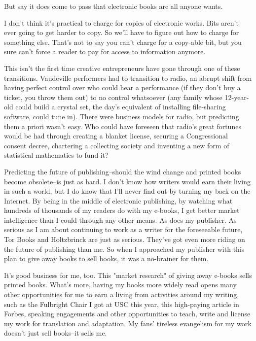 But say it does come to pass that electronic books are all anyone
wants.

I don't think it's practical to charge for copies of electronic
works. Bits aren't ever going to get harder to copy. So we'll have
to figure out how to charge for something else. That's not to say
you can't charge for a copy-able bit, but you sure can't force a
reader to pay for access to information anymore.

This isn't the first time creative entrepreneurs have gone through
one of these transitions. Vaudeville performers had to transition
to radio, an abrupt shift from having perfect control over who
could hear a performance (if they don't buy a ticket, you throw
them out) to no control whatsoever (any family whose 12-year-old
could build a crystal set, the day's equivalent of installing
file-sharing software, could tune in). There were business models
for radio, but predicting them a priori wasn't easy. Who could have
foreseen that radio's great fortunes would be had through creating
a blanket license, securing a Congressional consent decree,
chartering a collecting society and inventing a new form of
statistical mathematics to fund it?

Predicting the future of publishing--should the wind change and
printed books become obsolete--is just as hard. I don't know how
writers would earn their living in such a world, but I do know that
I'll never find out by turning my back on the Internet. By being in
the middle of electronic publishing, by watching what hundreds of
thousands of my readers do with my e-books, I get better market
intelligence than I could through any other means. As does my
publisher. As serious as I am about continuing to work as a writer
for the foreseeable future, Tor Books and Holtzbrinck are just as
serious. They've got even more riding on the future of publishing
than me. So when I approached my publisher with this plan to give
away books to sell books, it was a no-brainer for them.

It's good business for me, too. This "market research" of giving
away e-books sells printed books. What's more, having my books more
widely read opens many other opportunities for me to earn a living
from activities around my writing, such as the Fulbright Chair I
got at USC this year, this high-paying article in Forbes, speaking
engagements and other opportunities to teach, write and license my
work for translation and adaptation. My fans' tireless evangelism
for my work doesn't just sell books--it sells me.

